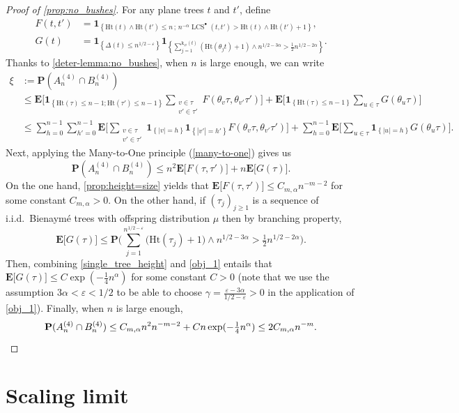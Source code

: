 \documentclass[11pt,reqno]{amsart}
\renewcommand{\P}{\mathbf{P}}
\newcommand{\1}{\mathbf{1}}
\newcommand{\0}{\mathbf{0}}
\newcommand{\E}{{\mathbf E}}
\newcommand{\I}[1]{{\mathbf 1}_{\left\{#1\right\}}}
\newcommand{\Ht}{\mathrm{Ht}}
\newcommand{\rk}{\mathrm{k}}
\newcommand{\LCS}{\operatorname{LCS}}
\begin{document}
\begin{proof}[Proof of \cref{prop:no_bushes}]
For any plane trees $t$ and $t'$, define
\begin{align*} 
F(t,t')&=\I{\Ht(t)\wedge\Ht(t')\leq n\, ;\, n^{-\alpha}\LCS^\bullet(t,t')>\Ht(t)\wedge\Ht(t')+1},\\
G(t)&=\I{\Delta(t)\leq n^{1/2-\varepsilon}}\I{\sum_{j=1}^{\rk_\varnothing(t)}(\Ht(\theta_j t)+1)\wedge n^{1/2-3\alpha}>\tfrac{1}{2}n^{1/2-2\alpha}}.
\end{align*}
Thanks to \cref{deter-lemma:no_bushes}, when $n$ is large enough, we can write
\begin{align*}
\xi&:=\P(A_n^{(4)}\cap B_n^{(4)})\\
&\leq \E\bigg[\I{\Ht(\tau)\leq n-1;\Ht(\tau')\leq n-1} \sum_{\substack{v\in\tau \\ v'\in\tau'}} F(\theta_{v}\tau,\theta_{v'}\tau')\bigg]
+\E\bigg[\I{\Ht(\tau)\leq n-1}\sum_{u\in\tau}G(\theta_u\tau)\bigg]\\
&\leq \sum_{h=0}^{n-1}\sum_{h'=0}^{n-1} \E\bigg[\sum_{\substack{v\in\tau \\ v'\in\tau'}}\I{|v|=h}\I{|v'|=h'}F(\theta_{v}\tau,\theta_{v'}\tau')\bigg]+\sum_{h=0}^{n-1}\E\bigg[\sum_{u\in\tau}\I{|u|=h}G(\theta_u\tau)\bigg].
\end{align*}
Next, applying the Many-to-One principle (\cref{many-to-one}) gives us
\[\P(A_n^{(4)}\cap B_n^{(4)})\leq n^2\E\big[F(\tau,\tau')\big]+n\E\big[G(\tau)\big].\]
On the one hand, \cref{prop:height=size} yields that $\E\big[F(\tau,\tau')\big]\leq C_{m,\alpha} n^{-m-2}$ for some constant $C_{m,\alpha}>0$. On the other hand, if $(\tau_j)_{j\geq 1}$ is a sequence of i.i.d.~Bienaymé trees with offspring distribution $\mu$ then by branching property,
\[\E\big[G(\tau)\big]\leq \P\bigg(\sum_{j=1}^{n^{1/2-\varepsilon}}\big(\Ht(\tau_j)+1\big)\wedge n^{1/2-3\alpha}>\tfrac{1}{2}n^{1/2-2\alpha}\bigg).\]
Then, combining \cref{single_tree_height} and \cref{obj_1} entails that $\E\big[G(\tau)\big]\leq C\exp(-\tfrac{1}{4}n^\alpha)$ for some constant $C>0$ (note that we use the assumption $3\alpha<\varepsilon<1/2$ to be able to choose $\gamma=\tfrac{\varepsilon-3\alpha}{1/2-\varepsilon}>0$ in the application of \cref{obj_1}). Finally, when $n$ is large enough,
\[\P(A_n^{(4)}\cap B_n^{(4)})\leq C_{m,\alpha} n^2 n^{-m-2}+C n \exp(-\tfrac{1}{4}n^\alpha)\leq 2C_{m,\alpha}n^{-m}.\qedhere\]
\end{proof}


\section{Scaling limit}\label{sec:Scaling_limit}
\end{document}
